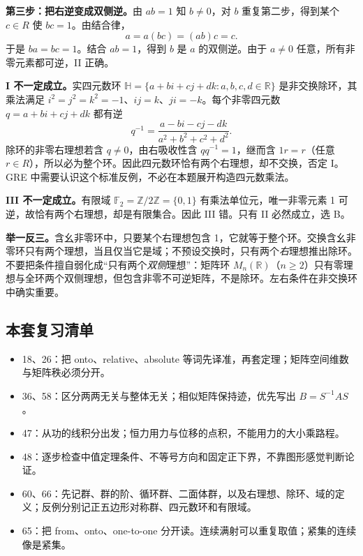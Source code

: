 \documentclass[11pt,a4paper,fontset=fandol]{ctexart}
\begin{document}
\textbf{第三步：把右逆变成双侧逆。}由 $ab=1$ 知 $b\ne0$，对 $b$ 重复第二步，得到某个 $c\in R$ 使 $bc=1$。由结合律，
\[
a=a(bc)=(ab)c=c.
\]
于是 $ba=bc=1$。结合 $ab=1$，得到 $b$ 是 $a$ 的双侧逆。由于 $a\ne0$ 任意，所有非零元素都可逆，II 正确。

\textbf{I 不一定成立。}实四元数环 $\mathbb H=\{a+bi+cj+dk:a,b,c,d\in\mathbb R\}$ 是非交换除环，其乘法满足 $i^2=j^2=k^2=-1$、$ij=k$、$ji=-k$。每个非零四元数 $q=a+bi+cj+dk$ 都有逆
\[
q^{-1}=\frac{a-bi-cj-dk}{a^2+b^2+c^2+d^2}.
\]
除环的非零右理想若含 $q\ne0$，由右吸收性含 $qq^{-1}=1$，继而含 $1r=r$（任意 $r\in R$），所以必为整个环。因此四元数环恰有两个右理想，却不交换，否定 I。GRE 中需要认识这个标准反例，不必在本题展开构造四元数乘法。

\textbf{III 不一定成立。}有限域 $\mathbb F_2=\mathbb Z/2\mathbb Z=\{0,1\}$ 有乘法单位元，唯一非零元素 1 可逆，故恰有两个右理想，却是有限集合。因此 III 错。只有 II 必然成立，选 B。

\textbf{举一反三。}含幺非零环中，只要某个右理想包含 1，它就等于整个环。交换含幺非零环只有两个理想，当且仅当它是域；不预设交换时，只有两个\emph{右}理想推出除环。不要把条件擅自弱化成“只有两个\emph{双侧}理想”：矩阵环 $M_n(\mathbb R)$（$n\ge2$）只有零理想与全环两个双侧理想，但包含非零不可逆矩阵，不是除环。左右条件在非交换环中确实重要。

\subsection{本套复习清单}
\begin{itemize}
\item 18、26：把 onto、relative、absolute 等词先译准，再套定理；矩阵空间维数与矩阵秩必须分开。
\item 36、58：区分两两无关与整体无关；相似矩阵保持迹，优先写出 $B=S^{-1}AS$。
\item 47：从功的线积分出发；恒力用力与位移的点积，不能用力的大小乘路程。
\item 48：逐步检查中值定理条件、不等号方向和固定正下界，不靠图形感觉判断论证。
\item 60、66：先记群、群的阶、循环群、二面体群，以及右理想、除环、域的定义；反例分别记正五边形对称群、四元数环和有限域。
\item 65：把 from、onto、one-to-one 分开读。连续满射可以重复取值；紧集的连续像是紧集。
\end{itemize}
\end{document}
